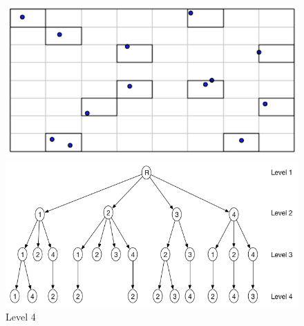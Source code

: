 \documentclass{article}
\begin{document}
\begin{figure}[ht]
\caption{Level 4}
  \centering
  \begin{minipage}[b]{0.35\textwidth}
    \includegraphics[width=\textwidth]{Quadtree_basic_scenario4}  
  \end{minipage}
  \hfill
  \begin{minipage}[b]{0.6\textwidth}
    \includegraphics[width=\textwidth]{1_1Quad_4_tree}
  \end{minipage}
\end{figure}
\end{document}
